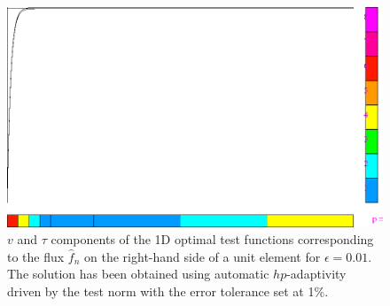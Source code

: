 \begin{figure}[!h]
\centering
\includegraphics[scale=.3]{figs/opt.png}
\caption{$v$ and $\tau$ components of the 1D optimal test functions corresponding to the flux $\widehat{f}_n$ on the right-hand side of a unit element for $\epsilon = 0.01$. The solution has been obtained using automatic $hp$-adaptivity driven by the test norm with the error tolerance set at 1\%.}
\label{fig:optTestBoundary}
\end{figure}




